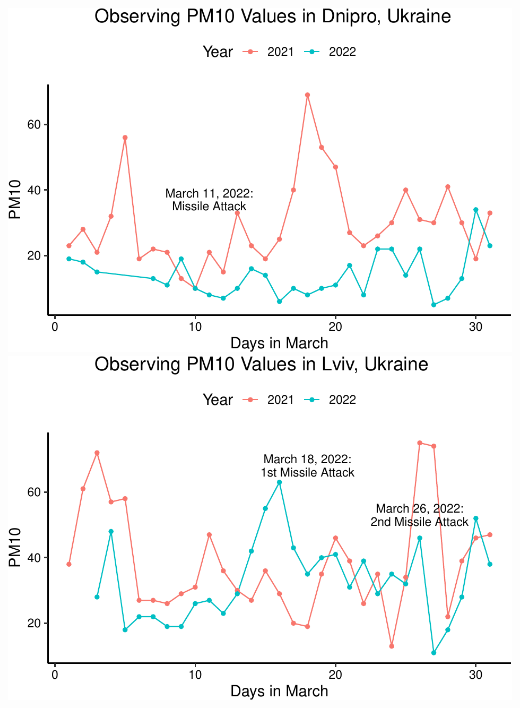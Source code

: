 \documentclass[
  12pt,
]{article}
\begin{document}
\includegraphics{Fontanie_Gordon_Weinberg_Project_files/figure-latex/Plotting PM10-1.pdf}
\includegraphics{Fontanie_Gordon_Weinberg_Project_files/figure-latex/Plotting PM10-2.pdf}
\end{document}
